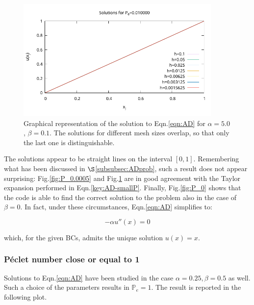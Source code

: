 \documentclass[11pt]{article}
\theoremstyle{theorem}
\theoremstyle{definition}
\begin{document}
\begin{figure}[H]
	\begin{center}
		\includegraphics[width=0.9\textwidth]{ADRsol4.pdf}
	\end{center}
	\caption{Graphical representation of the solution to Eqn.\eqref{eqn:AD} for $\alpha=5.0$ , $\beta=0.1$. The solutions for different mesh sizes overlap, so that only the last one is distinguishable.
		\label{fig:P_0.01}}
\end{figure} 

The solutions appear to be straight lines on the interval $[0, 1]$. Remembering what has been discussed in $\S$\ref{subsubsec:ADprob}, such a result does not appear surprising: Fig.\ref{fig:P_0.0005} and Fig.\ref{fig:P_0.01} are in good agreement with the Taylor expansion performed in Eqn.\eqref{key:AD-smallP}. Finally, Fig.\ref{fig:P_0} shows that the code is able to find the correct solution to the problem also in the case of $\beta=0$. In fact, under these circumstances, Eqn.\eqref{eqn:AD} simplifies to:

$$-\alpha u''(x)=0$$

which, for the given BCs, admits the unique solution $u(x)=x$.\\

\subsubsection{P\'{e}clet number close or equal to 1}
Solutions to Eqn.\eqref{eqn:AD} have been studied in the case $\alpha=0.25, \beta=0.5$ as well. Such a choice of the parameters results in $\mathbb{P}_e=1$. The result is reported in the following plot.
\end{document}
